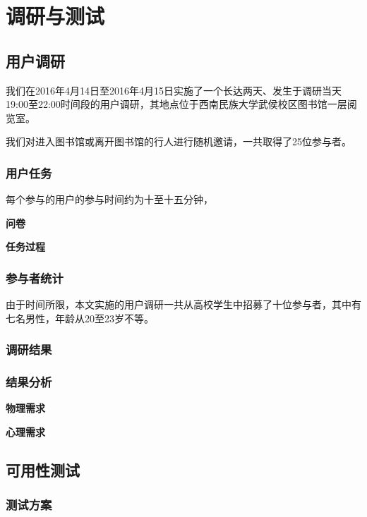 \chapter{调研与测试}

\section{用户调研}

我们在2016年4月14日至2016年4月15日实施了一个长达两天、发生于调研当天19:00至22:00时间段的用户调研，其地点位于西南民族大学武侯校区图书馆一层阅览室。

我们对进入图书馆或离开图书馆的行人进行随机邀请，一共取得了25位参与者。

\subsection{用户任务}

每个参与的用户的参与时间约为十至十五分钟，

\textbf{问卷}

\textbf{任务过程}

\subsection{参与者统计}

由于时间所限，本文实施的用户调研一共从高校学生中招募了十位参与者，其中有七名男性，年龄从20至23岁不等。

\subsection{调研结果}

\subsection{结果分析}

\textbf{物理需求}

\textbf{心理需求}

\textbf{}

\section{可用性测试}

\subsection{测试方案}

\subsection{}


\cleardoublepage
